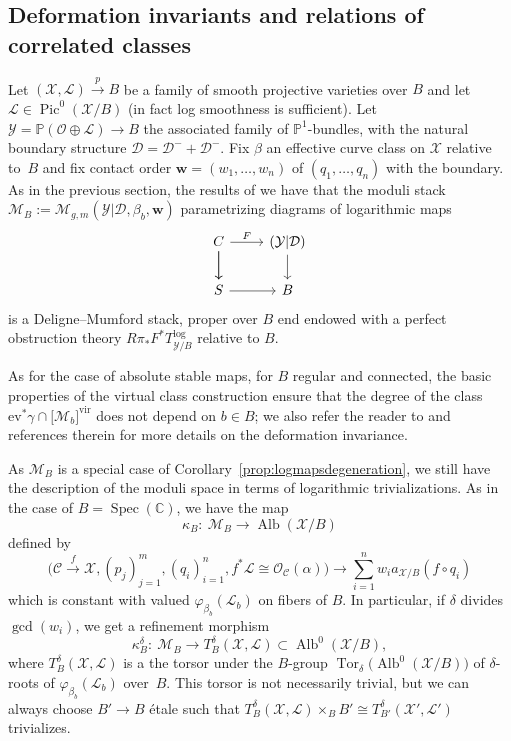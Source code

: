 \documentclass[pdftex]{sigma}
\newcommand{\vir}[1]{\big[#1\big]^\mathrm{vir}}
\newcommand{\ev}{\mathrm{ev}}
\newcommand{\Pic}{\operatorname{Pic}}
\newcommand{\Alb}{\operatorname{Alb}}
\newcommand{\bfw}{ {\boldsymbol w} }
\newcommand{\D}{\mathcal{D}}
\renewcommand{\L}{\mathcal{L}}
\newcommand{\M}{\mathcal{M}}
\newcommand{\X}{\mathcal{X}}
\newcommand{\C}{\mathcal{C}}
\renewcommand{\O}{\mathcal{O}}
\newcommand{\Y}{\mathcal{Y}}
\numberwithin{equation}{section}
\theoremstyle{definition}
\begin{document}
\subsection{Deformation invariants and relations of correlated classes}
Let $(\X,\L)\xrightarrow{p} B$ be a family of smooth projective varieties over $B$ and let $\mathcal L\in \Pic^0(\mathcal X\slash B)$ (in fact log smoothness is sufficient).
Let $\Y=\mathbb P(\O\oplus\L)\to B$ the associated family of $\mathbb P^1$-bundles, with the natural boundary structure $\D=\mathcal D^- +\mathcal D^-$.
Fix $\beta$ an effective curve class on $\X$ relative to~$B$ and
fix contact order $\bfw=(w_1,\dots,w_n)$ of $(q_1,\dots,q_n)$ with the boundary.
As in the previous section, the results of \cite{abramovich2014stable,gross2013logarithmic,maulik2023logarithmic} we have that the moduli stack
$\M_B:=\M_{g, m}(\mathcal Y|\D,\beta_b, \bfw)$
parametrizing diagrams of logarithmic maps
\[
\begin{tikzcd}
C\ar[r,"F"]\ar[d]\ar[d] & (\mathcal Y|\mathcal{D})\ar[d]\\
S\ar[r] & B
\end{tikzcd}
\]
is a Deligne--Mumford stack, proper over $B$ end endowed with a perfect obstruction theory $R\pi_*F^*T^{\log}_{\mathcal Y\slash B}$ relative to $B$.

As for the case of absolute stable maps,
for $B$ regular and connected, the basic properties of the virtual class construction \cite{behrend1997intrinsic,manolache2012virtual} ensure that
the degree of the class $\ev^*\gamma\cap\vir{\M_b}$ does not depend on $b\in B$; we also refer the reader to \cite[Appendix~A]{mandel2020descendant} and references therein for more details on the deformation invariance.

As $\M_B$ is a special case of Corollary~\ref{prop:logmapsdegeneration}, we still have the description of the moduli space in terms of logarithmic trivializations. As in the case of $B=\operatorname{Spec}(\mathbb C)$, we have the map
\[\kappa_B\colon\ \M_B\to\Alb(\mathcal X\slash B)\]
defined by
\[\bigl(\C\xrightarrow{f}\X,(p_j)_{j=1}^m,(q_i)_{i=1}^n,f^*\L\cong\O_{\C}(\alpha)\bigr)\rightarrow \sum_{i=1}^n w_i a_{\X\slash B}(f\circ q_i)\]
which is constant with valued $\varphi_{\beta_b}(\L_b)$ on fibers of $B$. In particular, if $\delta$ divides $\gcd(w_i)$, we get a refinement morphism
\[\kappa^\delta_B\colon\ \M_B\longrightarrow T^\delta_B(\X,\L)\subset \Alb^0(\X/B),
\]
where $T^\delta_B(\X,\L)$ is a the torsor under the $B$-group $\operatorname{Tor}_{\delta}\bigl(\Alb^0(\mathcal X\slash B)\bigr)$ of $\delta$-roots of $\varphi_{\beta_b}(\L_b)$ over~$B$. This torsor is not necessarily trivial, but we can always choose $B'\to B$ \'etale such that $T^\delta_B(\X,\L)\times_B B'\cong T^\delta_{B'}(\X',\L')$ trivializes.
\end{document}
